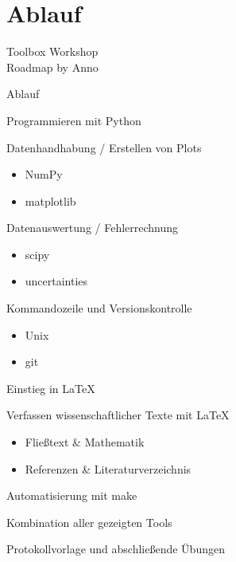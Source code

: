 \section{Ablauf}

\begin{frame}
    \begin{center}
        \Huge Toolbox Workshop \\
        Roadmap by Anno
    \end{center}
\end{frame}

\begin{frame}{Ablauf}
  \begin{description}
    \item[Montag] Programmieren mit Python
    \item[Dienstag] Datenhandhabung / Erstellen von Plots
      \begin{itemize}
        \item NumPy
        \item matplotlib
      \end{itemize}
    \item[Mittwoch] Datenauswertung / Fehlerrechnung
      \begin{itemize}
        \item scipy
        \item uncertainties
      \end{itemize}
    \item[Donnerstag] Kommandozeile und Versionskontrolle
      \begin{itemize}
        \item Unix
        \item git
      \end{itemize}
    \item[Freitag] Einstieg in \LaTeX
    \item[Nächste Woche] Verfassen wissenschaftlicher Texte mit \LaTeX{}
      \begin{itemize}
        \item Fließtext \& Mathematik
        \item Referenzen \& Literaturverzeichnis
      \end{itemize}
      \item Automatisierung mit make
      \item Kombination aller gezeigten Tools
      \item Protokollvorlage und abschließende Übungen
  \end{description}
\end{frame}
